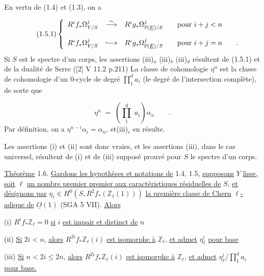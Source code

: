En vertu de (1.4) et (1.3), on a

\begin{equation}\tag{1.5.1}
\left\{
\begin{array}{ccl}
R^i f_* \Omega^j_{Y/S} & \stackrel{\sim}{\longrightarrow} & R^i g_* \Omega^j_{\mathbb{P}(\underline{E})/S} \qquad \mbox{pour } i+j < n \\[3ex]
R^i f_* \Omega^j_{Y/S} & \lhook\joinrel\longrightarrow & R^i g_* \Omega^j_{\mathbb{P}(\underline{E})/S} \qquad \mbox{pour } i+j = n \qquad .
\end{array}
\right.
\end{equation}
Si $S$ est le spectre d'un corps, les assertions (iii)$_a$ (iii)$_b$ (iii)$_d$ résultent de (1.5.1) et de la dualité de Serre ([2] V 11.2 p.211) La classe de
cohomologie $\eta^n$ est la classe de cohomologie d'un $0$-cycle de degré $\prod_1^d a_i$ (le degré de l'intersection complète), de sorte que

\begin{equation*}
\eta^n \;=\; \left( \prod_1^d \; a_i \right) \alpha_n \qquad .
\end{equation*}
Par définition, on a $\eta^{n-i} \alpha_i = \alpha_n$, et(iii)$_c$ en résulte.

Les assertions (i) et (ii) sont donc vraies, et les assertions (iii), dans le cas universel, résultent de (i) et de (iii) supposé prouvé pour $S$ le spectre d'un corps.

\underline{Théorème} 1.6. \underline{Gardons les hypothèses et notations de} 1.4, 1.5, \underline{supposons} $Y$ \underline{lisse,} \underline{soit} $\ell$ \underline{un nombre premier premier aux caractéristiques résiduelles de} $S$, \underline{et désignons par} $\eta_\ell \in H^0(S,R^2 f_*( \mathbb{Z}_\ell(1)))$ \underline{la première classe de Chern} $\ell$\underline{-adique de} $\underline{O}(1)$ (SGA 5 VII). \underline{Alors}

(i) $R^i f_* \mathbb{Z}_\ell = 0$ \underline{si} $i$ \underline{est impair et distinct de} $n$

(ii) \underline{Si} $2i < n$, \underline{alors} $R^{2i} f_* \mathbb{Z}_\ell(i)$ \underline{est isomorphe à} $\mathbb{Z}_\ell$, \underline{et admet} $\eta_\ell^i$ \underline{pour base}

(iii) \underline{Si} $n < 2i \leq 2n$, \underline{alors} $R^{2i} f_* \mathbb{Z}_\ell(i)$ \underline{est isomorphe à} $\mathbb{Z}_\ell$, \underline{et admet} $\eta_\ell^i / \prod_1^d a_i$ \underline{pour base.}

